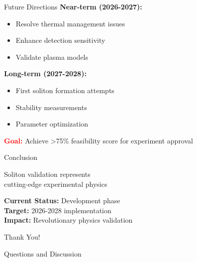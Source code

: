 \documentclass[aspectratio=169,xcolor={table,dvipsnames}]{beamer}
\newcommand{\highlight}[1]{\textcolor{red}{\textbf{#1}}}
\begin{document}
\begin{frame}{Future Directions}
    \textbf{Near-term (2026-2027):}
    \begin{itemize}
        \item Resolve thermal management issues
        \item Enhance detection sensitivity
        \item Validate plasma models
    \end{itemize}
    
    \textbf{Long-term (2027-2028):}
    \begin{itemize}
        \item First soliton formation attempts
        \item Stability measurements
        \item Parameter optimization
    \end{itemize}
    
    \vspace{0.3cm}
    \highlight{Goal:} Achieve >75\% feasibility score for experiment approval
\end{frame}

\begin{frame}{Conclusion}
    \begin{center}
        \Large
        Soliton validation represents\\
        cutting-edge experimental physics
        
        \vspace{1cm}
        \normalsize
        \textbf{Current Status:} Development phase\\
        \textbf{Target:} 2026-2028 implementation\\
        \textbf{Impact:} Revolutionary physics validation
    \end{center}
\end{frame}

\begin{frame}
    \begin{center}
        \Huge Thank You!
        
        \vspace{1cm}
        \Large Questions and Discussion
    \end{center}
\end{frame}
\end{document}
